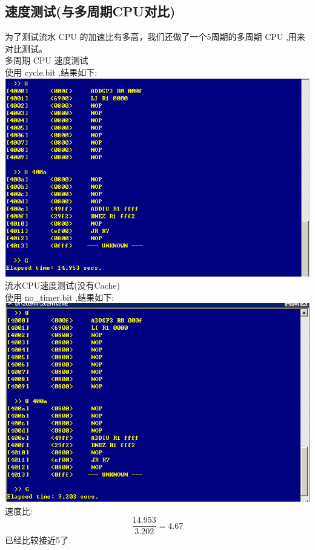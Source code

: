 \documentclass[10pt]{article}
\begin{document}
\begin{CJK}{UTF8}{gbsn}
\subsection{速度测试(与多周期CPU对比)}
为了测试流水 CPU 的加速比有多高，我们还做了一个5周期的多周期 CPU ,用来对比测试。\\
多周期 CPU 速度测试\\
使用 cycle.bit ,结果如下:\\
\includegraphics[width=\linewidth]{wzw_speed_long.png}
流水CPU速度测试(没有Cache)\\
使用 no\_timer.bit ,结果如下:\\
\includegraphics[width=\linewidth]{no_time_speed_long.png}
速度比:\\
$$\frac{14.953}{3.202}=4.67$$
已经比较接近5了.


\end{CJK}
\end{document}
